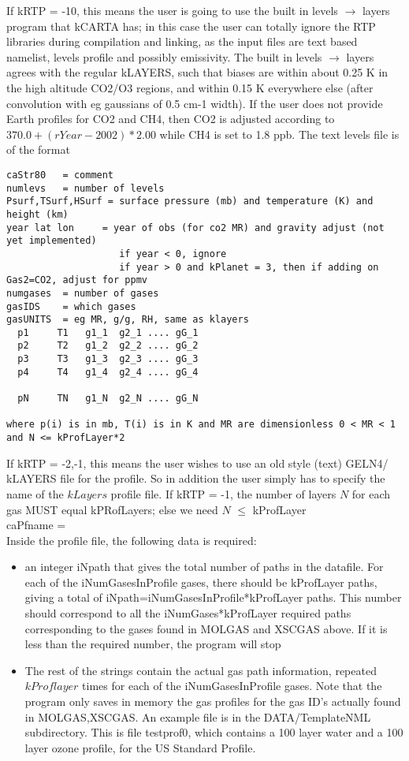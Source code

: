 \documentclass[12pt]{article}
\newcommand{\ttab}{\indent\indent}
\begin{document}
{If kRTP = -10, this means the user is going to use the built in levels $\rightarrow$ layers
program that kCARTA has; in this case the user can totally ignore the RTP libraries during
compilation and linking, as the input files are text based namelist, levels profile and
possibly emissivity. The built in levels $\rightarrow$ layers agrees with the regular 
kLAYERS, such that biases are within about 0.25 K in the high altitude CO2/O3 regions, and 
within 0.15 K everywhere else (after convolution with eg gaussians of 0.5 cm-1 width). If 
the user does not provide Earth profiles for CO2 and CH4, then CO2 is adjusted according
to $ 370.0 + (rYear-2002)*2.00 $ while CH4 is set to 1.8 ppb. The text levels file is of 
the format
\begin{verbatim}
caStr80   = comment
numlevs   = number of levels
Psurf,TSurf,HSurf = surface pressure (mb) and temperature (K) and height (km)
year lat lon     = year of obs (for co2 MR) and gravity adjust (not yet implemented)
                    if year < 0, ignore
                    if year > 0 and kPlanet = 3, then if adding on Gas2=CO2, adjust for ppmv
numgases  = number of gases
gasIDS    = which gases
gasUNITS  = eg MR, g/g, RH, same as klayers
  p1     T1   g1_1  g2_1 .... gG_1
  p2     T2   g1_2  g2_2 .... gG_2
  p3     T3   g1_3  g2_3 .... gG_3
  p4     T4   g1_4  g2_4 .... gG_4

  pN     TN   g1_N  g2_N .... gG_N

where p(i) is in mb, T(i) is in K and MR are dimensionless 0 < MR < 1
and N <= kProfLayer*2
\end{verbatim}

If kRTP = -2,-1, this means the user wishes to use an old style (text) GELN4/
kLAYERS file for the profile. So in addition the user simply has to specify 
the name  of the $kLayers$ profile file. If kRTP = -1, the number of layers $N$
for each gas MUST equal kPRofLayers; else we need $N$ $\le$ kProfLayer\\
{\sf 
\ttab caPfname = \\
}
Inside the profile file, the following data is required: \\
\begin{itemize}
\item an integer iNpath that gives the total number of paths in the datafile. 
   For each of the iNumGasesInProfile gases, there should be kProfLayer paths,
  giving a total of iNpath=iNumGasesInProfile*kProfLayer paths. This number 
  should correspond to all the iNumGases*kProfLayer required paths 
  corresponding to the gases found in MOLGAS and XSCGAS above. If it is less 
  than the required number, the program will stop
\item The rest of the  strings contain the actual gas path information, 
   repeated $kProflayer$ times for each of the iNumGasesInProfile gases.  
   Note that the program only saves in memory the gas profiles for the gas 
   ID's actually found in MOLGAS,XSCGAS. An example file is in the 
   {\sf DATA/TemplateNML} subdirectory. This is file {\sf testprof0}, which 
   contains a 100 layer water and a 100 layer ozone profile, for the US 
   Standard Profile.  
\end{itemize}

}
\end{document}
